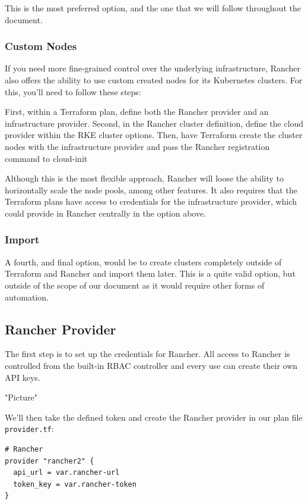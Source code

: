 This is the most preferred option, and the one that we will follow throughout the document.

\subsubsection{Custom Nodes}

If you need more fine-grained control over the underlying infrastructure, Rancher also offers the ability to use custom created nodes for its Kubernetes clusters. For this, you'll need to follow these steps:

First, within a  Terraform plan, define both the Rancher provider and an infrastructure provider. Second, in the Rancher cluster definition, define the cloud provider within the RKE cluster options. Then, have Terraform create the cluster nodes with the infrastructure provider and pass the Rancher registration command to cloud-init

Although this is the most flexible approach, Rancher will loose the ability to horizontally scale the node pools, among other features. It also requires that the Terraform plans have access to credentials for the infrastructure provider, which could provide in Rancher centrally in the option above.

\subsubsection{Import}

A fourth, and final option, would be to create clusters completely outside of Terraform and Rancher and import them later. This is a quite valid option, but outside of the scope of our document as it would require other forms of automation.

\subsection{Rancher Provider}

The first step is to set up the credentials for Rancher. All access to Rancher is controlled from the built-in RBAC controller and every use can create their own API keys.

"Picture"

We'll then take the defined token and create the Rancher provider in our plan file \verb|provider.tf|:

\begin{lstlisting}[caption=Rancher Provider, frame=single, basicstyle=\ttfamily]
# Rancher
provider "rancher2" {
  api_url = var.rancher-url
  token_key = var.rancher-token
}
\end{lstlisting}

